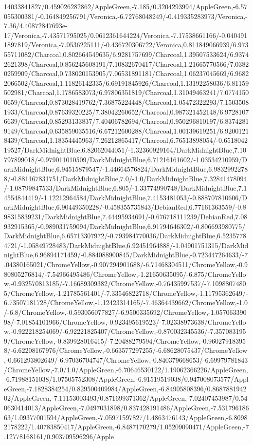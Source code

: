 {\begin{tikzternal}
14033841827/0.459026282862/AppleGreen,-7.185/0.3204293994/AppleGreen,-6.57055300381/-0.164849256791/Veronica,-6.72768048249/-0.419335283973/Veronica,-7.36/4.40872847693e-17/Veronica,-7.43571795025/0.0612361644224/Veronica,-7.17538661166/-0.0404911897819/Veronica,-7.0536225111/-0.436720306722/Veronica,0.811849066939/6.97355711082/Charcoal,0.802664549635/6.9281757699/Charcoal,1.39507533624/6.93742621398/Charcoal,0.856245608191/7.10832670417/Charcoal,1.21665770566/7.03820259909/Charcoal,0.738020153905/7.06531891181/Charcoal,1.06237045669/6.96822066502/Charcoal,1.11826142335/6.69191845926/Charcoal,1.13192258036/6.81159502981/Charcoal,1.1786583073/6.97806351819/Charcoal,1.31049463241/7.07741500659/Charcoal,0.873028419762/7.36875224448/Charcoal,1.05472322293/7.15035081933/Charcoal,0.87639320225/7.38042260652/Charcoal,0.987321452148/6.97281076639/Charcoal,0.85293133837/7.40406782694/Charcoal,0.950296810197/6.83742819149/Charcoal,0.635859035516/6.67212600288/Charcoal,1.00139619251/6.92001218439/Charcoal,1.18354445963/7.26212865417/Charcoal,6.76513898054/-0.651804219527/DarkMidnightBlue,6.82062044051/-1.32360929164/DarkMidnightBlue,7.10797899018/-0.979011010509/DarkMidnightBlue,6.71216161602/-1.03534210959/DarkMidnightBlue,6.94515879547/-1.44664576824/DarkMidnightBlue,6.98329922788/-0.881167831751/DarkMidnightBlue,7.0/-1.0/DarkMidnightBlue,7.32841478094/-1.08799847533/DarkMidnightBlue,6.805/-1.33774990748/DarkMidnightBlue,7.14554844419/-1.12212964584/DarkMidnightBlue,7.4153481053/-0.888707810606/DarkMidnightBlue,6.90449350228/-0.458355735843/DebianRed,6.77161363559/-0.898315839231/DarkMidnightBlue,7.44495934691/-0.676718111239/DebianRed,7.08932915365/-0.989031759094/DarkMidnightBlue,6.91794646302/-0.806693980775/DarkMidnightBlue,6.65713307972/-0.793984770036/DarkMidnightBlue,6.52357784721/-1.05849728483/DarkMidnightBlue,6.92451964888/-1.04901751315/DarkMidnightBlue,6.96894171459/-0.884088900845/DarkMidnightBlue,-0.723447264633/-7.04380165021/ChromeYellow,-0.907294901688/-6.71468304511/ChromeYellow,-0.980805276814/-7.54966495486/ChromeYellow,-1.21650635095/-6.875/ChromeYellow,-0.932570813185/-7.16689309382/ChromeYellow,-0.76435997537/-7.10988074805/ChromeYellow,-1.21785561401/-7.33546822718/ChromeYellow,-1.11795362649/-6.73507181728/ChromeYellow,-1.12423314165/-7.46364439662/ChromeYellow,-1.0/-6.8/ChromeYellow,-0.593056077827/-6.9500335692/ChromeYellow,-1.05706339098/-7.01854101966/ChromeYellow,-0.923495619523/-7.02338973638/ChromeYellow,-0.922218254069/-6.92221825407/ChromeYellow,-0.870032345536/-7.3570831959/ChromeYellow,-0.839928016415/-7.20488279594/ChromeYellow,-0.960279183958/-6.62208167976/ChromeYellow,-0.663577297255/-6.68628075437/ChromeYellow,-0.661293802649/-6.97036704747/ChromeYellow,-0.840379668653/-6.69979781843/ChromeYellow,-7.0/1.0/AppleGreen,-6.70646530122/1.19062366226/AppleGreen,-6.71988151038/1.07505752308/AppleGreen,-6.91519519038/0.947008073577/AppleGreen,-7.1828384254/0.829500409984/AppleGreen,-6.84905808396/0.868788194202/AppleGreen,-7.11153003493/0.871699371362/AppleGreen,-7.02407453987/0.540630414013/AppleGreen,-7.0497031898/0.837428191486/AppleGreen,-7.53179618663/1.09377001594/AppleGreen,-7.05971597827/1.4863476143/AppleGreen,-6.80982178222/1.40783850417/AppleGreen,-6.8487170279/1.05209090471/AppleGreen,-7.12778168161/0.903709596296/Apple
\end{tikzternal}}
